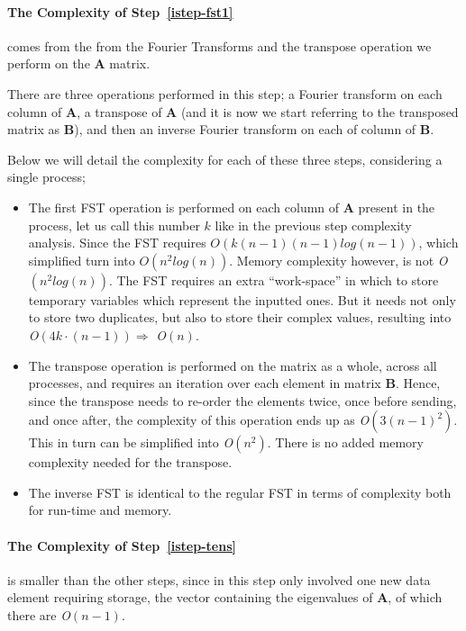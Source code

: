 \documentclass[fontsize=11pt,paper=a4,titlepage]{article}
\begin{document}
\paragraph{The Complexity of Step~\ref{istep-fst1}} comes from the from the
Fourier Transforms and the transpose operation we perform on the $\mathbf{A}$
matrix.

There are three operations performed in this step; a Fourier transform on each
column of $\mathbf{A}$, a transpose of $\mathbf{A}$ (and it is now we start
referring to the transposed matrix as $\mathbf{B}$), and then an inverse Fourier
transform on each of column of $\mathbf{B}$.

Below we will detail the complexity for each of these three steps, considering a
single process;

\begin{itemize}
	\item The first FST operation is performed on each column of $\mathbf{A}$
	present in the process, let us call this number $k$ like in the previous
	step complexity analysis. Since the FST requires $\textit{O}(k(n-1)
	(n-1)log(n-1))$, which simplified turn into $\textit{O}(n^2
	log(n))$. Memory complexity however, is not \textit{O}$(n^2log(n)
	)$. The FST requires an extra ``work-space'' in which to store temporary
	variables which represent the inputted ones. But it needs not only to store
	two duplicates, but also to store their complex values, resulting into {\it
	O}$(4k\cdot(n-1)) \Rightarrow$ \textit{O}$(n)$.

	\item The transpose operation is performed on the matrix as a whole, across
	all processes, and requires an iteration over each element in matrix $
	\mathbf{B}$. Hence, since the transpose needs to re-order the elements
	twice, once before sending, and once after, the complexity of this operation
	ends up as \textit{O}$(3(n-1)^2)$. This in turn can be simplified into
	\textit{O}$(n^2)$. There is no added memory complexity needed for the transpose.

	\item The inverse FST is identical to the regular FST in terms of complexity
	both for run-time and memory.
\end{itemize}

\paragraph{The Complexity of Step~\ref{istep-tens}} is smaller than the other
steps, since in this step only involved one new data element requiring storage,
the vector containing the eigenvalues of $\mathbf{A}$, of which there are {\it
O}$(n-1)$.
\end{document}
